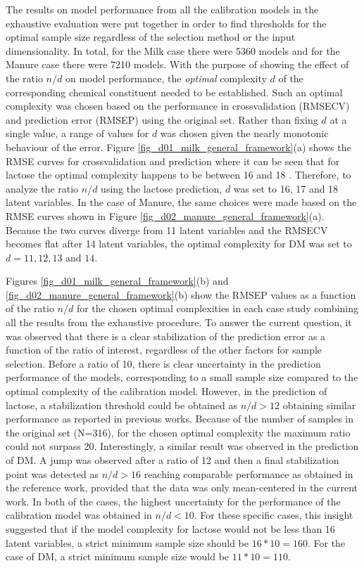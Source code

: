 \documentclass[journal=ancham,manuscript=article]{achemso}
\begin{document}
The results on model performance from all the calibration models in the exhaustive evaluation were put together in order to find thresholds for the optimal sample size regardless of the selection method or the input dimensionality. In total, for the Milk case there were 5360 models and for the Manure case there were 7210 models. With the purpose of showing the effect of the ratio $n/d$ on model performance, the \emph{optimal} complexity $d$ of the corresponding chemical constituent needed to be established. Such an optimal complexity was chosen based on the performance in crossvalidation (RMSECV) and prediction error (RMSEP) using the original set. Rather than fixing $d$ at a single value, a range of values for $d$ was chosen given the nearly monotonic behaviour of the error. 
Figure \ref{fig_d01_milk_general_framework}(a) shows the RMSE curves for crossvalidation and prediction where it can be seen that for lactose the optimal complexity happens to be between 16 and 18 \cite{Diaz-Olivares2020}. Therefore, to analyze the ratio $n/d$ using the lactose prediction, $d$ was set to 16, 17 and 18 latent variables. In the case of Manure, the same choices were made based on the RMSE curves shown in Figure \ref{fig_d02_manure_general_framework}(a). Because the two curves diverge from 11 latent variables and the RMSECV becomes flat after 14 latent variables, the optimal complexity for DM was set to $d = 11,12,13 \text{ and } 14$\cite{Saeys2005}. 

Figures \ref{fig_d01_milk_general_framework}(b) and \ref{fig_d02_manure_general_framework}(b) show the RMSEP values as a function of the ratio $n/d$ for the chosen optimal complexities in each case study combining all the results from the exhaustive procedure. To answer the current question, it was observed that there is a clear stabilization of the prediction error as a function of the ratio of interest, regardless of the other factors for sample selection. Before a ratio of 10, there is clear uncertainty in the prediction performance of the models, corresponding to a small sample size compared to the optimal complexity of the calibration model. However, in the prediction of lactose, a stabilization threshold could be obtained as $n/d>12$ obtaining similar performance as reported in previous works\cite{Diaz-Olivares2020, Aernouts2011}. Because of the number of samples in the original set (N=316), for the chosen optimal complexity the maximum ratio could not surpass 20. Interestingly, a similar result was observed in the prediction of DM. A jump was observed after a ratio of 12 and then a final stabilization point was detected as $n/d>16$ reaching comparable performance as obtained in the reference work, provided that the data was only mean-centered in the current work\cite{Saeys2005}. In both of the cases, the highest uncertainty for the performance of the calibration model was obtained in $n/d<10$. For these specific cases, this insight suggested that if the model complexity for lactose would not be less than 16 latent variables, a strict minimum sample size should be $16*10=160$. For the case of DM, a strict minimum sample size would be $11*10=110$. 
\end{document}
